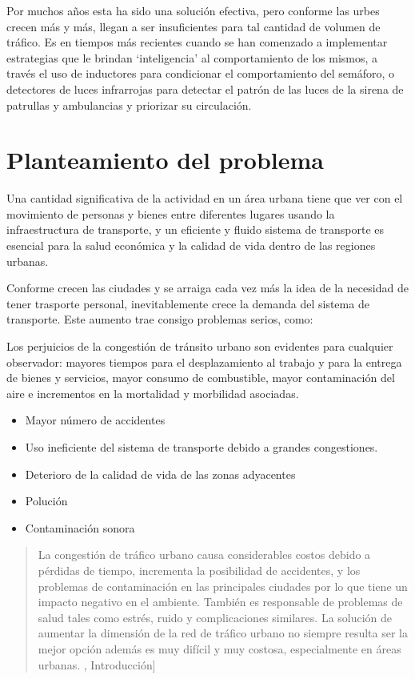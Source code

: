 Por muchos años esta ha sido una solución efectiva, pero conforme las
urbes crecen más y más, llegan a ser insuficientes para tal cantidad de
volumen de tráfico. Es en tiempos más recientes cuando se han comenzado
a implementar estrategias que le brindan `inteligencia' al
comportamiento de los mismos, a través el uso de inductores para
condicionar el comportamiento del semáforo, o detectores de luces
infrarrojas para detectar el patrón de las luces de la sirena de
patrullas y ambulancias y priorizar su circulación.

\hypertarget{planteamiento-del-problema}{%
\section{Planteamiento del problema}\label{planteamiento-del-problema}}

Una cantidad significativa de la actividad en un área urbana tiene que
ver con el movimiento de personas y bienes entre diferentes lugares
usando la infraestructura de transporte, y un eficiente y fluido sistema
de transporte es esencial para la salud económica y la calidad de vida
dentro de las regiones urbanas. \textcite[p. 3]{Patriksson2012}

Conforme crecen las ciudades y se arraiga cada vez más la idea de la
necesidad de tener trasporte personal, inevitablemente crece la demanda
del sistema de transporte. Este aumento trae consigo problemas serios,
como:

Los perjuicios de la congestión de tránsito urbano son evidentes para
cualquier observador: mayores tiempos para el desplazamiento al trabajo
y para la entrega de bienes y servicios, mayor consumo de combustible,
mayor contaminación del aire e incrementos en la mortalidad y morbilidad
asociadas. \textcite[p. 2]{Medina-Durango2011}

\begin{itemize}
\item
  Mayor número de accidentes
\item
  Uso ineficiente del sistema de transporte debido a grandes
  congestiones.
\item
  Deterioro de la calidad de vida de las zonas adyacentes
\item
  Polución
\item
  Contaminación sonora
\end{itemize}

\textcite{Patriksson2012}

\begin{quote}
La congestión de tráfico urbano causa considerables costos debido a
pérdidas de tiempo, incrementa la posibilidad de accidentes, y los
problemas de contaminación en las principales ciudades por lo que tiene
un impacto negativo en el ambiente. También es responsable de problemas
de salud tales como estrés, ruido y complicaciones similares. La
solución de aumentar la dimensión de la red de tráfico urbano no siempre
resulta ser la mejor opción además es muy difícil y muy costosa,
especialmente en áreas urbanas. \textcite{JoelTrejo2006},
Introducción{]}
\end{quote}

